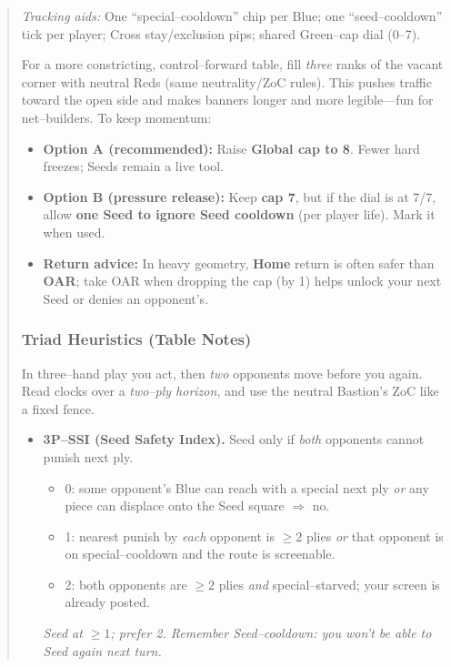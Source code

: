 \documentclass[11pt]{article}
\begin{document}
\begin{quote}
\medskip
\noindent\textit{Tracking aids:} One “special–cooldown” chip per Blue; one “seed–cooldown” tick per player; Cross stay/exclusion pips; shared Green–cap dial (0–7).

\begin{tcolorbox}[enhanced,breakable,title={Heavy Bastion (3–Rank Wall) — Optional Adjustments},
  colback=royal!3,colframe=royal!70!black,boxrule=0.8pt]
\small
For a more constricting, control–forward table, fill \emph{three} ranks of the vacant corner with neutral Reds (same neutrality/ZoC rules). This pushes traffic toward the open side and makes banners longer and more legible—fun for net–builders. To keep momentum:

\begin{itemize}[leftmargin=1.3em,itemsep=0.2em]
  \item \textbf{Option A (recommended):} Raise \textbf{Global cap to 8}. Fewer hard freezes; Seeds remain a live tool.
  \item \textbf{Option B (pressure release):} Keep \textbf{cap 7}, but if the dial is at 7/7, allow \textbf{one Seed to ignore Seed cooldown} (per player life). Mark it when used.
  \item \textbf{Return advice:} In heavy geometry, \textbf{Home} return is often safer than \textbf{OAR}; take OAR when dropping the cap (by 1) helps unlock your next Seed or denies an opponent’s.
\end{itemize}
\end{tcolorbox}

\subsubsection*{Triad Heuristics (Table Notes)}
\label{sec:triad-heuristics}

\noindent In three–hand play you act, then \emph{two} opponents move before you again. Read clocks over a \emph{two–ply horizon}, and use the neutral Bastion’s ZoC like a fixed fence.

\medskip
\begin{itemize}[leftmargin=1.3em,itemsep=0.35em]

  \item \textbf{3P–SSI (Seed Safety Index).} Seed only if \emph{both} opponents cannot punish next ply.
  \begin{itemize}[itemsep=0.2em]
    \item 0: some opponent’s Blue can reach with a special next ply \emph{or} any piece can displace onto the Seed square $\Rightarrow$ no.
    \item 1: nearest punish by \emph{each} opponent is $\ge 2$ plies \emph{or} that opponent is on special–cooldown and the route is screenable.
    \item 2: both opponents are $\ge 2$ plies \emph{and} special–starved; your screen is already posted.
  \end{itemize}
  \emph{Seed at $\ge 1$; prefer 2. Remember Seed–cooldown: you won’t be able to Seed again next turn.}


\end{itemize}
\end{quote}
\end{document}
